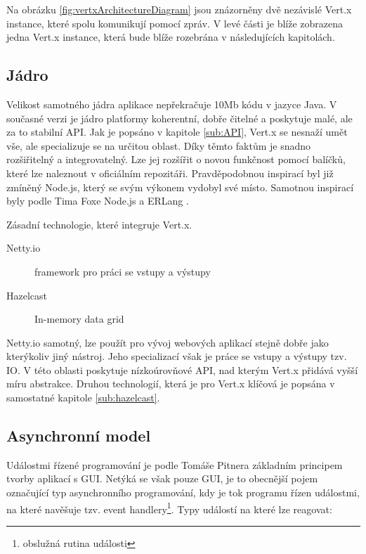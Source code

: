 Na obrázku \ref{fig:vertxArchitectureDiagram} jsou znázorněny dvě nezávislé Vert.x instance, které spolu komunikují pomocí zpráv. V levé části je blíže zobrazena jedna Vert.x instance, která bude blíže rozebrána v následujících kapitolách.

\subsection{Jádro}

Velikost samotného jádra aplikace nepřekračuje 10Mb kódu v jazyce Java. V současné verzi je jádro platformy koherentní, dobře čitelné a poskytuje malé, ale za to stabilní API. Jak je popsáno v kapitole \ref{sub:API}, Vert.x se nesnaží umět vše, ale specializuje se na určitou oblast. Díky těmto faktům je snadno rozšiřitelný a integrovatelný. Lze jej rozšířit o novou funkčnost pomocí balíčků, které lze naleznout v oficiálním repozitáři. Pravděpodobnou inspirací byl již zmíněný Node.js, který se svým výkonem vydobyl své místo. Samotnou inspirací byly podle Tima Foxe Node.js a ERLang \cite{vertxNodejs}.

\noindent Zásadní technologie, které integruje Vert.x.
\begin{description}
\item[Netty.io] framework pro práci se vstupy a výstupy
\item[Hazelcast] In-memory data grid \cite{inMemoryDataGrid}
\end{description}

Netty.io samotný, lze použít pro vývoj webových aplikací stejně dobře jako kterýkoliv jiný nástroj. Jeho specializací však je práce se vstupy a výstupy tzv. IO. V této oblasti poskytuje nízkoúrovňové API, nad kterým Vert.x přidává vyšší míru abstrakce. Druhou technologií, která je pro Vert.x klíčová je popsána v samostatné kapitole \ref{sub:hazelcast}.

\subsection{Asynchronní model}

Událostmi řízené programování je podle Tomáše Pitnera \cite{javaProgramovani} základním principem \\tvorby aplikací s GUI. Netýká se však pouze GUI, je to obecnější pojem označující typ asynchronního programování, kdy je tok programu řízen událostmi, na které navěšuje tzv. event handlery\footnote{obslužná rutina události}. Typy událostí na které lze reagovat:


